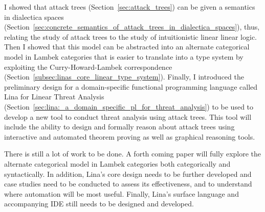 \documentclass{llncs}
\begin{document}
I showed that attack trees (Section~\ref{sec:attack_trees}) can be
given a semantics in dialectica spaces
(Section~\ref{sec:concrete_semantics_of_attack_trees_in_dialectica_spaces}),
thus, relating the study of attack trees to the study of
intuitionistic linear linear logic.  Then I showed that this model can
be abstracted into an alternate categorical model in Lambek categories
that is easier to translate into a type system by exploiting the
Curry-Howard-Lambek correspondence
(Section~\ref{subsec:linas_core_linear_type_system}).  Finally, I
introduced the preliminary design for a domain-specific functional
programming language called Lina for Linear Threat Analysis
(Section~\ref{sec:lina:_a_domain_specific_pl_for_threat_analysis}) to
be used to develop a new tool to conduct threat analysis using attack
trees.  This tool will include the ability to design and formally
reason about attack trees using interactive and automated theorem
proving as well as graphical reasoning tools.

There is still a lot of work to be done.  A forth coming paper will
fully explore the alternate categorical model in Lambek categories
both categorically and syntactically.  In addition, Lina's core design
needs to be further developed and case studies need to be conducted to
assess its effectiveness, and to understand where automation will be
most useful.  Finally, Lina's surface language and accompanying IDE
still needs to be designed and developed.






  

\end{document}
